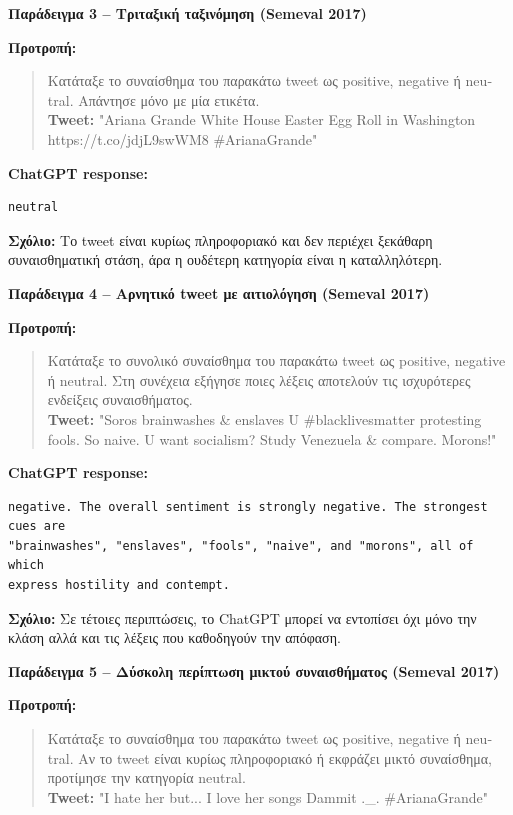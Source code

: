 \documentclass[11pt,a4paper]{article}
\begin{document}
\textbf{Παράδειγμα 3 -- Τριταξική ταξινόμηση (\textlatin{Semeval 2017})}

\textbf{Προτροπή:}
\begin{quote}
Κατάταξε το συναίσθημα του παρακάτω \textlatin{tweet} ως \textlatin{positive}, \textlatin{negative}
ή \textlatin{neutral}. Απάντησε μόνο με μία ετικέτα.\\
\textbf{\textlatin{Tweet:}} \textlatin{"Ariana Grande White House Easter Egg Roll in Washington https://t.co/jdjL9swWM8 \#ArianaGrande"}
\end{quote}

\textbf{\textlatin{ChatGPT response:}}
\begin{verbatim}
neutral
\end{verbatim}

\textbf{Σχόλιο:} Το \textlatin{tweet} είναι κυρίως πληροφοριακό και δεν περιέχει ξεκάθαρη συναισθηματική στάση, άρα η ουδέτερη κατηγορία είναι η καταλληλότερη.

\textbf{Παράδειγμα 4 -- Αρνητικό \textlatin{tweet} με αιτιολόγηση (\textlatin{Semeval 2017})}

\textbf{Προτροπή:}
\begin{quote}
Κατάταξε το συνολικό συναίσθημα του παρακάτω \textlatin{tweet} ως \textlatin{positive},
\textlatin{negative} ή \textlatin{neutral}. Στη συνέχεια εξήγησε ποιες λέξεις αποτελούν
τις ισχυρότερες ενδείξεις συναισθήματος.\\
\textbf{\textlatin{Tweet:}} \textlatin{"Soros brainwashes \& enslaves U \#blacklivesmatter protesting fools. So naive. U want socialism? Study Venezuela \& compare. Morons!"}
\end{quote}

\textbf{\textlatin{ChatGPT response:}}
\begin{verbatim}
negative. The overall sentiment is strongly negative. The strongest cues are
"brainwashes", "enslaves", "fools", "naive", and "morons", all of which
express hostility and contempt.
\end{verbatim}

\textbf{Σχόλιο:} Σε τέτοιες περιπτώσεις, το \textlatin{ChatGPT} μπορεί να εντοπίσει όχι μόνο την κλάση αλλά και τις λέξεις που καθοδηγούν την απόφαση.

\textbf{Παράδειγμα 5 -- Δύσκολη περίπτωση μικτού συναισθήματος (\textlatin{Semeval 2017})}

\textbf{Προτροπή:}
\begin{quote}
Κατάταξε το συναίσθημα του παρακάτω \textlatin{tweet} ως \textlatin{positive}, \textlatin{negative}
ή \textlatin{neutral}. Αν το \textlatin{tweet} είναι κυρίως πληροφοριακό ή εκφράζει μικτό
συναίσθημα, προτίμησε την κατηγορία \textlatin{neutral}.\\
\textbf{\textlatin{Tweet:}} \textlatin{"I hate her but... I love her songs Dammit .\_. \#ArianaGrande"}
\end{quote}
\end{document}
